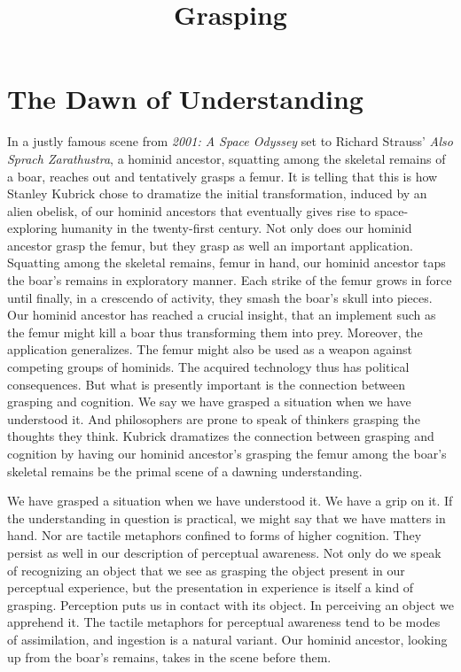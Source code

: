 \documentclass[12pt]{article}
\title{Grasping}
\author{\myauthor}
\date{} %
\begin{document}
\maketitle

\setlength{\parindent}{1em}


\section{The Dawn of Understanding} %
\label{sec:grasping_and_the_dawn_of_understanding}

In a justly famous scene from \emph{2001: A Space Odyssey} set to Richard Strauss' \emph{Also Sprach Zarathustra}, a hominid ancestor, squatting among the skeletal remains of a boar, reaches out and tentatively grasps a femur. It is telling that this is how Stanley Kubrick chose to dramatize the initial transformation, induced by an alien obelisk, of our hominid ancestors that eventually gives rise to space-exploring humanity in the twenty-first century. Not only does our hominid ancestor grasp the femur, but they grasp as well an important application. Squatting among the skeletal remains, femur in hand, our hominid ancestor taps the boar's remains in exploratory manner. Each strike of the femur grows in force until finally, in a crescendo of activity, they smash the boar's skull into pieces. Our hominid ancestor has reached a crucial insight, that an implement such as the femur might kill a boar thus transforming them into prey. Moreover, the application generalizes. The femur might also be used as a weapon against competing groups of hominids. The acquired technology thus has political consequences. But what is presently important is the connection between grasping and cognition. We say we have grasped a situation when we have understood it. And philosophers are prone to speak of thinkers grasping the thoughts they think. Kubrick dramatizes the connection between grasping and cognition by having our hominid ancestor's grasping the femur among the boar's skeletal remains be the primal scene of a dawning understanding.

We have grasped a situation when we have understood it. We have a grip on it. If the understanding in question is practical, we might say that we have matters in hand. Nor are tactile metaphors confined to forms of higher cognition. They persist as well in our description of perceptual awareness. Not only do we speak of recognizing an object that we see as grasping the object present in our perceptual experience, but the presentation in experience is itself a kind of grasping. Perception puts us in contact with its object. In perceiving an object we apprehend it. The tactile metaphors for perceptual awareness tend to be modes of assimilation, and ingestion is a natural variant. Our hominid ancestor, looking up from the boar's remains, takes in the scene before them.
\end{document}

